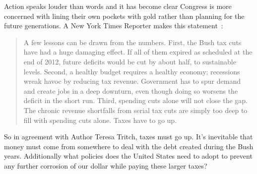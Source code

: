 \documentclass[pdflatex,12pt,a4paper]{report}
\begin{document}
\begin{doublespace}
Action speaks louder than words and it has become clear Congress is more concerned with lining their own pockets with gold rather than planning for the future generations. A New York Times Reporter makes this statement~\cite{tritch_how_2011}:  
\end{doublespace}
\begin{quotation}
A few lessons can be drawn from the numbers. First, the Bush tax cuts have had a huge damaging effect. If all of them expired as scheduled at the end of 2012, future deficits would be cut by about half, to sustainable levels. Second, a healthy budget requires a healthy economy; recessions wreak havoc by reducing tax revenue. Government has to spur demand and create jobs in a deep downturn, even though doing so worsens the deficit in the short run. Third, spending cuts alone will not close the gap. The chronic revenue shortfalls from serial tax cuts are simply too deep to fill with spending cuts alone. Taxes have to go up. 
\end{quotation}
\begin{doublespace}
So in agreement with Author Teresa Tritch, taxes must go up. It's inevitable that money must come from somewhere to deal with the debt created during the Bush years. Additionally what policies does the United States need to adopt to prevent any further corrosion of our dollar while paying these larger taxes?
\end{doublespace}
\end{document}

